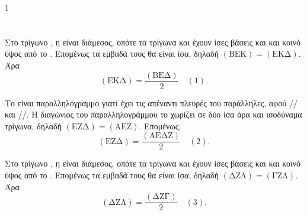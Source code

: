 \begin{ylh}{1}
    \item [Ύλη από εικόνα]
\end{ylh}
\section*{}
\begin{figure}
\end{figure}
\begin{alist}
    \item Στο τρίγωνο , η  είναι διάμεσος, οπότε τα τρίγωνα  και  έχουν ίσες βάσεις  και  και κοινό ύψος από το . Επομένως τα εμβαδά τους θα είναι ίσα, δηλαδή $(\text{ΒΕΚ}) = (\text{ΕΚΔ})$.
    Άρα
    \[ (\text{ΕΚΔ}) = \frac{(\text{ΒΕΔ})}{2} \quad (1). \]
    \item Το  είναι παραλληλόγραμμο γιατί έχει τις απέναντι πλευρές του παράλληλες, αφού // και //. Η διαγώνιος  του παραλληλογράμμου  το χωρίζει σε δύο ίσα άρα και ισοδύναμα τρίγωνα, δηλαδή $(\text{ΕΖΔ}) = (\text{ΑΕΖ})$.
    Επομένως,
    \[ (\text{ΕΖΔ}) = \frac{(\text{ΑΕΔΖ})}{2} \quad (2). \]
    \item Στο τρίγωνο , η  είναι διάμεσος, οπότε τα τρίγωνα  και  έχουν ίσες βάσεις  και  και κοινό ύψος από το . Επομένως τα εμβαδά τους θα είναι ίσα, δηλαδή $(\text{ΔΖΛ}) = (\text{ΓΖΛ})$.
    Άρα
    \[ (\text{ΔΖΛ}) = \frac{(\text{ΔΖΓ})}{2} \quad (3). \]
\end{alist}
